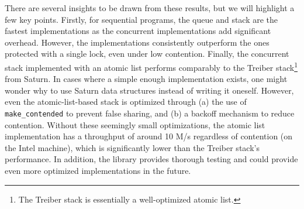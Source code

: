 \documentclass[a4paper, 11pt]{article}
\begin{document}
There are several insights to be drawn from these results, but we will highlight a few key points. Firstly, for sequential programs, the \Stdlib queue and stack are the fastest implementations as the concurrent implementations add significant overhead. However, the \Saturn implementations consistently outperform the \Stdlib ones protected with a single lock, even under low contention. Finally, the concurrent stack implemented with an atomic list performs comparably to the Treiber stack\footnote[2]{The Treiber stack is essentially a well-optimized atomic list.} from Saturn. In cases where a simple enough implementation exists, one might wonder why to use Saturn data structures instead of writing it oneself. However, even the atomic-list-based stack is optimized through
(a) the use of \texttt{make\_contended} to prevent false sharing, and
(b) a backoff mechanism to reduce contention.
Without these seemingly small optimizations, the atomic list implementation has a throughput of around 10 M/s regardless of contention (on the Intel machine), which is significantly lower than the Treiber stack's performance. In addition, the \Saturn library provides thorough testing and could provide even more optimized implementations in the future.
\end{document}
